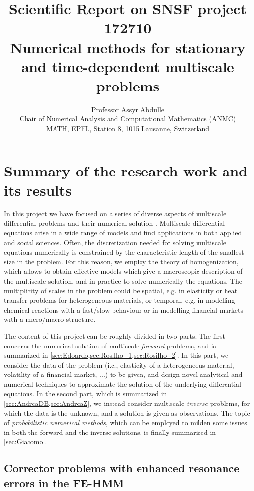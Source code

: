 \documentclass[10pt]{article}
\title{Scientific Report on SNSF project 172710 \\ Numerical methods for stationary and time-dependent multiscale problems}
\author{Professor Assyr Abdulle \\
	Chair of Numerical Analysis and Computational Mathematics (ANMC) \\
	MATH, EPFL, Station 8, 1015 Lausanne, Switzerland
}
\date{}
\begin{document}
	
\maketitle	

\section{Summary of the research work and its results}

In this project we have focused on a series of diverse aspects of multiscale differential problems \cite{BLP78,CiD99} and their numerical solution \cite{AEE12}. Multiscale differential equations arise in a wide range of models and find applications in both applied and social sciences. Often, the discretization needed for solving multiscale equations numerically is constrained by the characteristic length of the smallest size in the problem. For this reason, we employ the theory of homogenization, which allows to obtain effective models which give a macroscopic description of the multiscale solution, and in practice to solve numerically the equations. The multiplicity of scales in the problem could be spatial, e.g. in elasticity or heat transfer problems for heterogeneous materials, or temporal, e.g. in modelling chemical reactions with a fast/slow behaviour or in modelling financial markets with a micro/macro structure.

The content of this project can be roughly divided in two parts. The first concerns the numerical solution of multiscale \textit{forward} problems, and is summarized in \cref{sec:Edoardo,sec:Rosilho_1,sec:Rosilho_2}. In this part, we consider the data of the problem (i.e., elasticity of a heterogeneous material, volatility of a financial market, ...) to be given, and design novel analytical and numerical techniques to approximate the solution of the underlying differential equations. In the second part, which is summarized in \cref{sec:AndreaDB,sec:AndreaZ}, we instead consider multiscale \textit{inverse} problems, for which the data is the unknown, and a solution is given as observations. The topic of \textit{probabilistic numerical methods}, which can be employed to milden some issues in both the forward and the inverse solutions, is finally summarized in \cref{sec:Giacomo}.

\subsection{Corrector problems with enhanced resonance errors in the FE-HMM}\label{sec:Edoardo}
\end{document}
